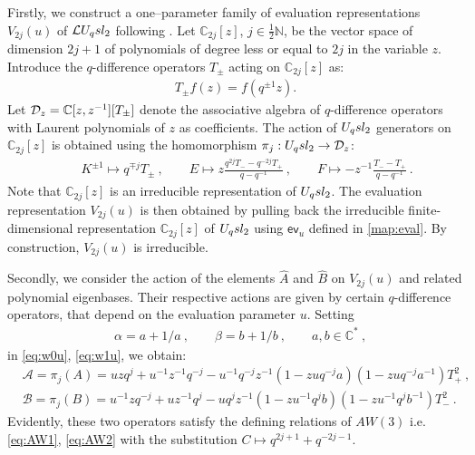 \documentclass[11pt]{amsart}
\numberwithin{equation}{section}
\numberwithin{equation}{section}
\begin{document}
 Firstly, we construct a one--parameter family of  evaluation representations $V_{2j}(u)$ of $\mathcal{L} U_q sl_2$ following \cite[Sec.\,4.2]{CP91}. Let $\mathbb{C}_{2j}[z]$, $j\in\frac{1}{2}{\mathbb N}$, be the vector space of dimension $2j+1$ of polynomials of degree less or equal to $2j$ in the variable $z$. Introduce the $q$-difference operators $T_\pm$ acting on $\mathbb{C}_{2j}[z]$ as:
\begin{align}
  T_\pm f(z)=f(q^{\pm 1} z).
\end{align}
Let ${\cal D}_z = {\mathbb C}[z,z^{-1}][T_\pm]$
denote the associative algebra of $q$-difference operators
with Laurent polynomials of $z$ as coefficients. The action of $U_q sl_2$ generators on $\mathbb{C}_{2j}[z]$ is obtained using the homomorphism $\pi_j: U_q sl_2 \rightarrow  {\cal D}_z$:
\begin{align}\label{eq:pij}
  &\quad  K^{\pm 1}\mapsto q^{\mp j}T_\pm\ , 
  \qquad E \mapsto z\frac{q^{2j}T_- - q^{-2j}T_+}{q-q^{-1}}\ , \qquad F \mapsto -z^{-1}\frac{T_- - T_+}{q-q^{-1}}\ .
\end{align}
Note that $\mathbb{C}_{2j}[z]$ is an irreducible representation of $U_q sl_2$.
The evaluation representation $V_{2j}(u)$ is 
then obtained by pulling back the irreducible finite-dimensional  representation ${\mathbb C}_{2j}[z]$ of $U_q sl_2$ using $\mathsf{ev}_u$ defined in \eqref{map:eval}. By construction, $V_{2j}(u)$  is irreducible.

 Secondly, we consider the action of the elements $\widehat A$ and $\widehat B$ on $V_{2j}(u)$ and  related polynomial eigenbases. Their respective actions are given by certain $q$-difference operators, that depend on the evaluation parameter $u$.
Setting 
\begin{align}
    &\alpha=a+1/a\ , \qquad   \beta=b+1/b\ ,\qquad a,b\in{\mathbb C}^*\ ,\label{eq:paramab}
\end{align}
in \eqref{eq:w0u}, \eqref{eq:w1u},
we obtain:
\begin{align}
  &  \mathcal{A}=\pi_j(A)= u z q^j +u^{-1}z^{-1}q^{-j} -u^{-1} q^{-j}z^{-1}(1-zu q^{-j}a)(1-zu q^{-j}a^{- 1})T_+^2 \ , \\
   &  \mathcal{B}=\pi_j(B)= u^{-1} z q^{-j} +u z^{-1}q^{j} -uq^{j}z^{-1}(1-zu^{-1}q^{j}b)(1-zu^{-1}q^{j}b^{-1})T_-^2 \ .
\end{align}
 Evidently, these two operators satisfy the defining relations of $AW(3)$ i.e. \eqref{eq:AW1}, \eqref{eq:AW2} with the substitution $C \mapsto q^{2j+1}+ q^{-2j-1}$.
\end{document}
